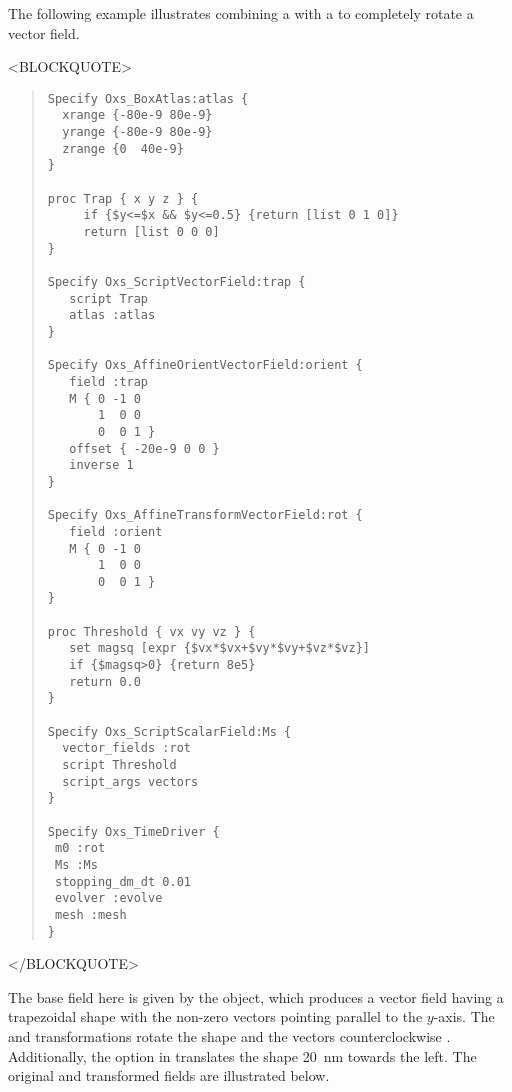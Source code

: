\begin{description}
The following example illustrates combining a
 with a
to completely rotate a vector field.
\begin{rawhtml}
<BLOCKQUOTE>
\end{rawhtml}
\begin{quote}
\begin{verbatim}
Specify Oxs_BoxAtlas:atlas {
  xrange {-80e-9 80e-9}
  yrange {-80e-9 80e-9}
  zrange {0  40e-9}
}

proc Trap { x y z } {
     if {$y<=$x && $y<=0.5} {return [list 0 1 0]}
     return [list 0 0 0]
}

Specify Oxs_ScriptVectorField:trap {
   script Trap
   atlas :atlas
}

Specify Oxs_AffineOrientVectorField:orient {
   field :trap
   M { 0 -1 0
       1  0 0
       0  0 1 }
   offset { -20e-9 0 0 }
   inverse 1
}

Specify Oxs_AffineTransformVectorField:rot {
   field :orient
   M { 0 -1 0
       1  0 0
       0  0 1 }
}

proc Threshold { vx vy vz } {
   set magsq [expr {$vx*$vx+$vy*$vy+$vz*$vz}]
   if {$magsq>0} {return 8e5}
   return 0.0
}

Specify Oxs_ScriptScalarField:Ms {
  vector_fields :rot
  script Threshold
  script_args vectors
}

Specify Oxs_TimeDriver {
 m0 :rot
 Ms :Ms
 stopping_dm_dt 0.01
 evolver :evolve
 mesh :mesh
}
\end{verbatim}
\end{quote}
\begin{rawhtml}
</BLOCKQUOTE>
\end{rawhtml}
The base field here is given by the 
object, which produces a vector field having a trapezoidal shape with
the non-zero vectors pointing parallel to the $y$-axis.  The
 and  transformations rotate the shape and the
vectors counterclockwise .
Additionally, the  option in  translates the
shape 20~nm towards the left.  The original and transformed fields are
illustrated below.
%


\end{description}
